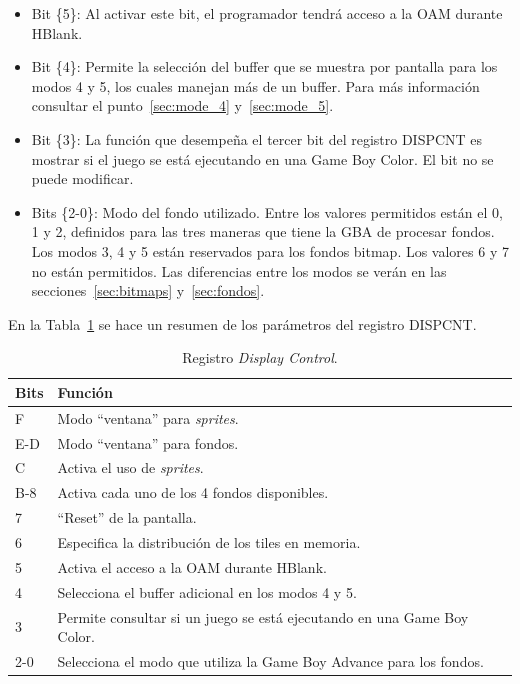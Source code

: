 \begin{itemize}
	\item Bit \{5\}: Al activar este bit, el programador tendrá acceso a la OAM durante HBlank.
	\item Bit \{4\}: Permite la selección del buffer que se muestra por pantalla para los modos 4 y 5, los cuales manejan más de un buffer. Para más información consultar el punto~\ref{sec:mode_4} y~\ref{sec:mode_5}. 
	\item Bit \{3\}: La función que desempeña el tercer bit del registro DISPCNT es mostrar si el juego se está ejecutando en una Game Boy Color. El bit no se puede modificar. 
	\item Bits \{2-0\}: Modo del fondo utilizado. Entre los valores permitidos están el 0, 1 y 2, definidos para las tres maneras que tiene la GBA de procesar fondos. Los modos 3, 4 y 5 están reservados para los fondos bitmap. Los valores 6 y 7 no están permitidos. Las diferencias entre los modos se verán en las secciones~\ref{sec:bitmaps} y~\ref{sec:fondos}.
\end{itemize}

En la Tabla~\ref{tab:dispcnt} se hace un resumen de los parámetros del registro DISPCNT.

\begin{table}[h]
	\centering
	\begin{tabular}{| l | l |}
		\hline
		\textbf{Bits} & \textbf{Función}  \\ \hline
		F & Modo ``ventana'' para \textit{sprites}.  \\ \hline
		E-D & Modo ``ventana'' para fondos.  \\ \hline
		C & Activa el uso de \textit{sprites}.  \\ \hline
		B-8 & Activa cada uno de los 4 fondos disponibles.  \\ \hline
		7 & ``Reset'' de la pantalla.  \\ \hline
		6 & Especifica la distribución de los tiles en memoria. \\ \hline
		5 & Activa el acceso a la OAM durante HBlank. \\ \hline
		4 & Selecciona el buffer adicional en los modos 4 y 5. \\ \hline
		3 & Permite consultar si un juego se está ejecutando en una Game Boy Color. \\ \hline
		2-0 & Selecciona el modo que utiliza la Game Boy Advance para los fondos. \\ \hline
	\end{tabular}
	\caption{Registro \textit{Display Control}.}\label{tab:dispcnt}
\end{table}
\FloatBarrier{}

